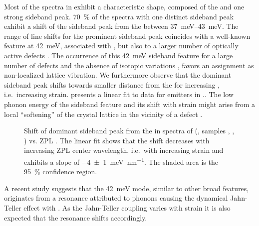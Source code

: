 		Most of the spectra in \vl exhibit a characteristic shape, composed of the \ZPL and one strong sideband peak.
		\SI{70}{\percent} of the \pl spectra with one distinct sideband peak exhibit a shift of the sideband peak from the \ZPL between \SIrange{37}{43}{meV}.
		The range of line shifts for the prominent sideband peak coincides with a well-known feature at \SI{42}{meV}, associated with \sivs \cite{Larkins1971,Sternschulte1994}, but also to a larger number of optically active defects \cite{Sternschulte1994}.
		The occurrence of this \SI{42}{meV} sideband feature for a large number of defects and the absence of isotopic variations \cite{Dietrich2014}, favors an assignment as non-localized lattice vibration.
		We furthermore observe that the dominant sideband peak shifts towards smaller distance from the \ZPL for increasing \ZPL \cwl, i.e.\ increasing strain.  presents a linear fit to data for emitters in \vl..
		The low phonon energy of the sideband feature and its shift with strain might arise from a local ``softening'' of the crystal lattice in the vicinity of a defect \cite{Sternschulte1994}.

		\begin{figure}[!htb]
			\centering
			\caption[Shift of dominant side band peaks for \sivs]{Shift of dominant sideband peak from the \ZPL in spectra of \sivs (\vl, samples \insituF, \insituS, \insituH) vs. ZPL \cwl. The linear fit shows that the shift decreases with increasing ZPL center wavelength, i.e.\ with increasing strain and exhibits a slope of \SI[separate-uncertainty]{-4\pm1}{\milli\electronvolt\per\nano\meter}. The shaded area is the \SI{95}{\percent} confidence region.}
			\label{fig::sideband_fit}
		\end{figure}

		A recent study \cite{Londero2016} suggests that the \SI{42}{meV} mode, similar to other broad \psb features, originates from a resonance attributed to phonons causing the dynamical Jahn-Teller effect with \sivs \cite{Fu2009}.
		As the Jahn-Teller coupling varies with strain it is also expected that the resonance shifts accordingly.
		
